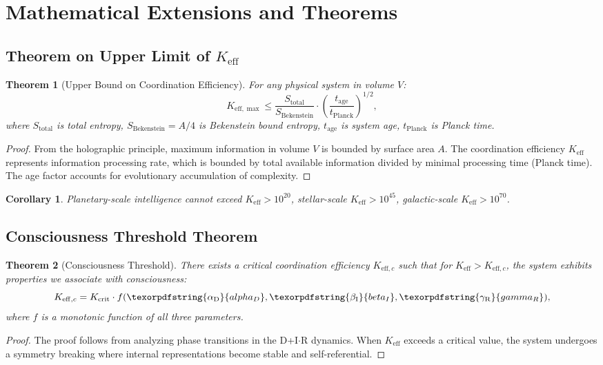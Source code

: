 \documentclass[12pt,a4paper]{article}
\newtheorem{theorem}{Theorem}
\newtheorem{corollary}{Corollary}
\DeclareRobustCommand{\alD}{\texorpdfstring{\ensuremath{\alpha_{\mathrm{D}}}}{alpha_D}}
\DeclareRobustCommand{\beI}{\texorpdfstring{\ensuremath{\beta_{\mathrm{I}}}}{beta_I}}
\DeclareRobustCommand{\gaR}{\texorpdfstring{\ensuremath{\gamma_{\mathrm{R}}}}{gamma_R}}
\newcommand{\Ke}{K_{\mathrm{eff}}}
\newcommand{\Kemax}{K_{\mathrm{eff},\max}}
\newcommand{\Kec}{K_{\mathrm{eff},c}}
\newcommand{\Kcrit}{K_{\mathrm{crit}}}
\begin{document}
	\section{Mathematical Extensions and Theorems}
	
	\subsection{Theorem on Upper Limit of \(\Ke\)}
	
	\begin{theorem}[Upper Bound on Coordination Efficiency]
		For any physical system in volume \(V\):
		\[
		\Kemax \leq \frac{S_{\mathrm{total}}}{S_{\mathrm{Bekenstein}}} \cdot \left(\frac{t_{\mathrm{age}}}{t_{\mathrm{Planck}}}\right)^{1/2},
		\]
		where \(S_{\mathrm{total}}\) is total entropy, \(S_{\mathrm{Bekenstein}} = A/4\) is Bekenstein bound entropy, \(t_{\mathrm{age}}\) is system age, \(t_{\mathrm{Planck}}\) is Planck time.
	\end{theorem}
	
	\begin{proof}
		From the holographic principle, maximum information in volume \(V\) is bounded by surface area \(A\). The coordination efficiency \(\Ke\) represents information processing rate, which is bounded by total available information divided by minimal processing time (Planck time). The age factor accounts for evolutionary accumulation of complexity.
	\end{proof}
	
	\begin{corollary}
		Planetary-scale intelligence cannot exceed \(\Ke > 10^{20}\), stellar-scale \(\Ke > 10^{45}\), galactic-scale \(\Ke > 10^{70}\).
	\end{corollary}
	
	\subsection{Consciousness Threshold Theorem}
	
	\begin{theorem}[Consciousness Threshold]
		There exists a critical coordination efficiency \(\Kec\) such that for \(\Ke > \Kec\), the system exhibits properties we associate with consciousness:
		\[
		\Kec = \Kcrit \cdot f(\alD, \beI, \gaR),
		\]
		where \(f\) is a monotonic function of all three parameters.
	\end{theorem}
	
	\begin{proof}
		The proof follows from analyzing phase transitions in the D+I\(\cdot\)R dynamics. When \(\Ke\) exceeds a critical value, the system undergoes a symmetry breaking where internal representations become stable and self-referential.
	\end{proof}
	
\end{document}
